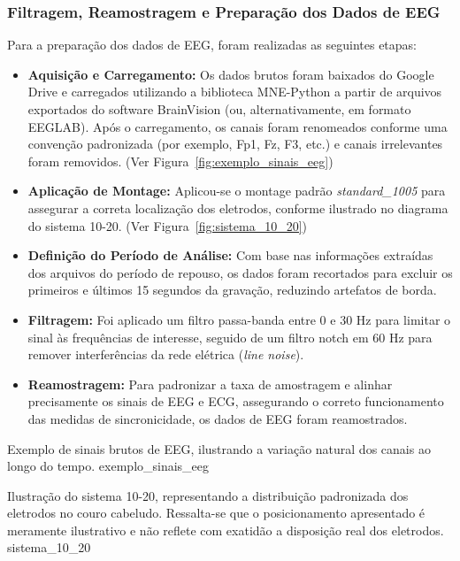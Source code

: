 \subsubsection{Filtragem, Reamostragem e Preparação dos Dados de EEG}
Para a preparação dos dados de EEG, foram realizadas as seguintes etapas:
\begin{itemize}
    \item \textbf{Aquisição e Carregamento:} Os dados brutos foram baixados do Google Drive e carregados utilizando a biblioteca MNE-Python a partir de arquivos exportados do software BrainVision (ou, alternativamente, em formato EEGLAB). Após o carregamento, os canais foram renomeados conforme uma convenção padronizada (por exemplo, Fp1, Fz, F3, etc.) e canais irrelevantes foram removidos. (Ver Figura~\ref{fig:exemplo_sinais_eeg})
    \item \textbf{Aplicação de Montage:} Aplicou-se o montage padrão \textit{standard\_1005} para assegurar a correta localização dos eletrodos, conforme ilustrado no diagrama do sistema 10-20. (Ver Figura~\ref{fig:sistema_10_20})
    \item \textbf{Definição do Período de Análise:} Com base nas informações extraídas dos arquivos do período de repouso, os dados foram recortados para excluir os primeiros e últimos 15 segundos da gravação, reduzindo artefatos de borda.
    \item \textbf{Filtragem:} Foi aplicado um filtro passa-banda entre 0 e 30 Hz para limitar o sinal às frequências de interesse, seguido de um filtro notch em 60 Hz para remover interferências da rede elétrica (\textit{line noise}).
    \item \textbf{Reamostragem:} Para padronizar a taxa de amostragem e alinhar precisamente os sinais de EEG e ECG, assegurando o correto funcionamento das medidas de sincronicidade, os dados de EEG foram reamostrados.
\end{itemize}

{Exemplo de sinais brutos de EEG, ilustrando a variação natural dos canais ao longo do tempo.}
{exemplo_sinais_eeg}

{Ilustração do sistema 10-20, representando a distribuição padronizada dos eletrodos no couro cabeludo. Ressalta-se que o posicionamento apresentado é meramente ilustrativo e não reflete com exatidão a disposição real dos eletrodos.}
{sistema_10_20}



